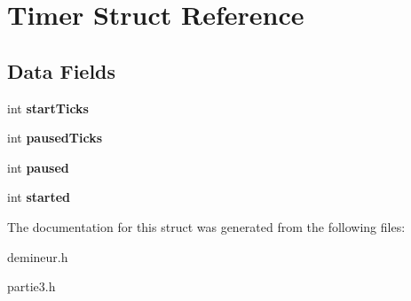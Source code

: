 \hypertarget{struct_timer}{
\section{Timer Struct Reference}
\label{struct_timer}
}
\subsection*{Data Fields}
\begin{DoxyCompactItemize}
\item 
\hypertarget{struct_timer_ab8fcc04d0f94da221296e034febbb560}{
int {\bfseries startTicks}}
\label{struct_timer_ab8fcc04d0f94da221296e034febbb560}

\item 
\hypertarget{struct_timer_a629b078313fa5ef67587fec513d343a2}{
int {\bfseries pausedTicks}}
\label{struct_timer_a629b078313fa5ef67587fec513d343a2}

\item 
\hypertarget{struct_timer_a868659a2f991de87c2b0dcbe6cea6175}{
int {\bfseries paused}}
\label{struct_timer_a868659a2f991de87c2b0dcbe6cea6175}

\item 
\hypertarget{struct_timer_abfafc640452d742a5a404a158ce4737a}{
int {\bfseries started}}
\label{struct_timer_abfafc640452d742a5a404a158ce4737a}

\end{DoxyCompactItemize}


The documentation for this struct was generated from the following files:\begin{DoxyCompactItemize}
\item 
demineur.h\item 
partie3.h\end{DoxyCompactItemize}
